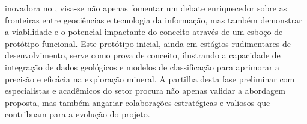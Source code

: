 \documentclass[11pt]{article} %
\begin{document}
{inovadora no , visa-se não apenas fomentar um debate
enriquecedor sobre as fronteiras entre geociências e tecnologia da informação, mas
também demonstrar a viabilidade e o potencial impactante do conceito através de um
esboço de protótipo funcional. Este protótipo inicial, ainda em estágios rudimentares de
desenvolvimento, serve como prova de conceito, ilustrando a capacidade de integração de
dados geológicos e modelos de classificação para aprimorar a precisão e eficácia na
exploração mineral. A partilha desta fase preliminar com especialistas e acadêmicos do
setor procura não apenas validar a abordagem proposta, mas também angariar
colaborações estratégicas e  valiosos que contribuam para a evolução do projeto.
}
\end{document}
